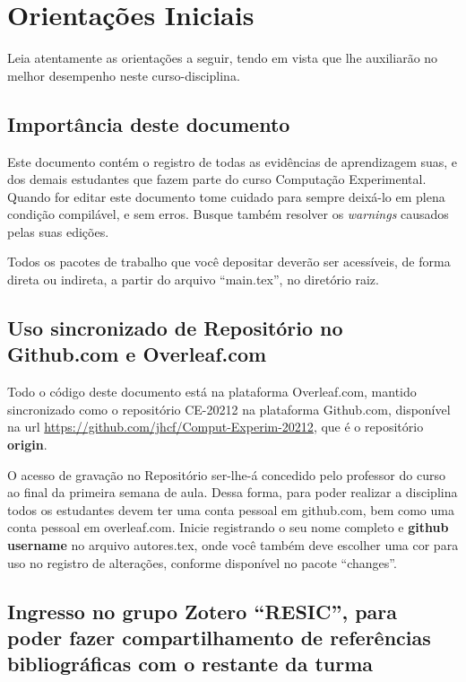 \chapter{Orientações Iniciais}

Leia atentamente as orientações a seguir, tendo em vista que lhe auxiliarão no melhor desempenho neste curso-disciplina. 

\section{Importância deste documento}

Este documento contém o registro de todas as evidências de aprendizagem suas, e dos demais estudantes que fazem parte do curso Computação Experimental.
Quando for editar este documento tome cuidado para sempre deixá-lo em plena condição compilável, e sem erros. Busque também resolver os \textit{warnings} causados pelas suas edições.

Todos os pacotes de trabalho que você depositar deverão ser acessíveis, de forma direta ou indireta, a partir do arquivo ``main.tex'', no diretório raiz.

\section{Uso sincronizado de Repositório no Github.com e Overleaf.com}

Todo o código deste documento está na plataforma Overleaf.com, mantido sincronizado como o repositório CE-20212 na plataforma Github.com, disponível na url \url{https://github.com/jhcf/Comput-Experim-20212}, que é o repositório \textbf{origin}.


O acesso de gravação no Repositório ser-lhe-á concedido pelo professor do curso ao final da primeira semana de aula.
Dessa forma, para poder realizar a disciplina todos os estudantes devem ter uma conta pessoal em github.com, bem como uma conta pessoal em overleaf.com. Inicie registrando o seu nome completo e \textbf{github username} no arquivo autores.tex, onde você também deve escolher uma cor para uso no registro de alterações, conforme disponível no pacote ``changes''.

\section{Ingresso no grupo Zotero ``RESIC'', para poder fazer  compartilhamento de referências bibliográficas com o restante da turma}

